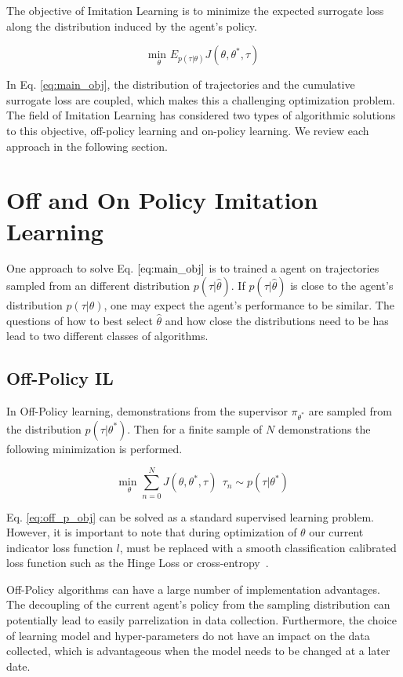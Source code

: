 \documentclass[conference]{article}
\begin{document}
The objective of Imitation Learning is to minimize the expected surrogate loss along the distribution induced by the agent's policy. 


\begin{equation}\label{eq:main_obj}
\underset{\theta}{\mbox{min }} E_{p(\tau|\theta)} J(\theta,\theta^*,\tau) 
\end{equation}

In Eq. \ref{eq:main_obj}, the distribution of trajectories and the cumulative surrogate loss are coupled, which makes this a challenging optimization problem. The field of Imitation Learning has considered two types of algorithmic solutions to this objective, off-policy learning and on-policy learning. We review each approach in the following section. 


\section{Off and On Policy Imitation Learning}
One approach to solve Eq. $\ref{eq:main_obj}$ is to trained a agent on trajectories sampled from an different distribution $p(\tau|\hat{\theta})$. If $p(\tau|\hat{\theta})$ is close to the agent's distribution $p(\tau|\theta)$, one may expect the agent's performance to be similar. The questions of how to best select $\hat{\theta}$ and how close the distributions need to be  has lead to two different classes of algorithms.  


\subsection{Off-Policy IL} In Off-Policy learning, demonstrations from the supervisor $\pi_{\theta^*}$  are sampled from the distribution $p(\tau|\theta^*)$. Then for a finite sample of $N$ demonstrations the following minimization is performed. 

\begin{equation}\label{eq:off_p_obj}
\underset{\theta}{\mbox{min }} \sum^N_{n=0} J(\theta,\theta^*,\tau)  \: \: \tau_n \sim p(\tau|\theta^*) 
\end{equation}

Eq. \ref{eq:off_p_obj} can be solved as a standard supervised learning problem. However, it is important to note that during optimization of $\theta$ our current indicator loss function $l$, must be replaced with a smooth classification calibrated loss function such as the Hinge Loss or cross-entropy~\cite{bartlett2006convexity}.

Off-Policy algorithms can have a large number of implementation advantages. The decoupling of the current agent's policy from the sampling distribution can potentially lead to easily parrelization in data collection. Furthermore, the choice of learning model and hyper-parameters do not have an impact on the data collected, which is advantageous when the model needs to be changed at a later date. 
\end{document}
